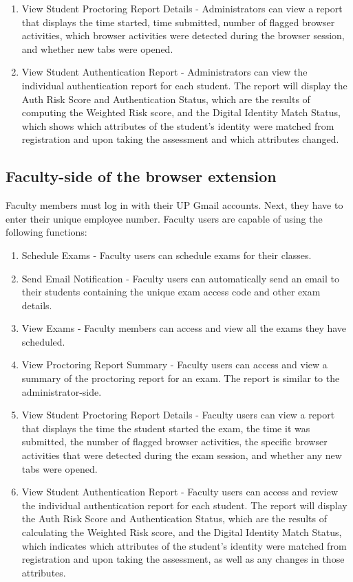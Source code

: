 \documentclass{icsthesis}
\begin{document}
\begin{mainmatter}
\begin{enumerate}
    \item View Student Proctoring Report Details - Administrators can view a report that displays the time started, time submitted, number of flagged browser activities, which browser activities were detected during the browser session, and whether new tabs were opened.
    \item View Student Authentication Report - Administrators can view the individual authentication report for each student. The report will display the Auth Risk Score and Authentication Status, which are the results of computing the Weighted Risk score, and the Digital Identity Match Status, which shows which attributes of the student's identity were matched from registration and upon taking the assessment and which attributes changed.

\end{enumerate}

\subsection{Faculty-side of the browser extension}
Faculty members must log in with their UP Gmail accounts. Next, they have to enter their unique employee number. Faculty users are capable of using the following functions:

 \begin{enumerate}
    \item Schedule Exams - Faculty users can schedule exams for their classes.
    \item Send Email Notification - Faculty users can automatically send an email to their students containing the unique exam access code and other exam details.
    \item View Exams - Faculty members can access and view all the exams they have scheduled.
    \item View Proctoring Report Summary - Faculty users can access and view a summary of the proctoring report for an exam. The report is similar to the administrator-side.
    \item View Student Proctoring Report Details - Faculty users can view a report that displays the time the student started the exam, the time it was submitted, the number of flagged browser activities, the specific browser activities that were detected during the exam session, and whether any new tabs were opened.
    \item View Student Authentication Report - Faculty users can access and review the individual authentication report for each student. The report will display the Auth Risk Score and Authentication Status, which are the results of calculating the Weighted Risk score, and the Digital Identity Match Status, which indicates which attributes of the student's identity were matched from registration and upon taking the assessment, as well as any changes in those attributes.


\end{enumerate}
\end{mainmatter}
\end{document}
